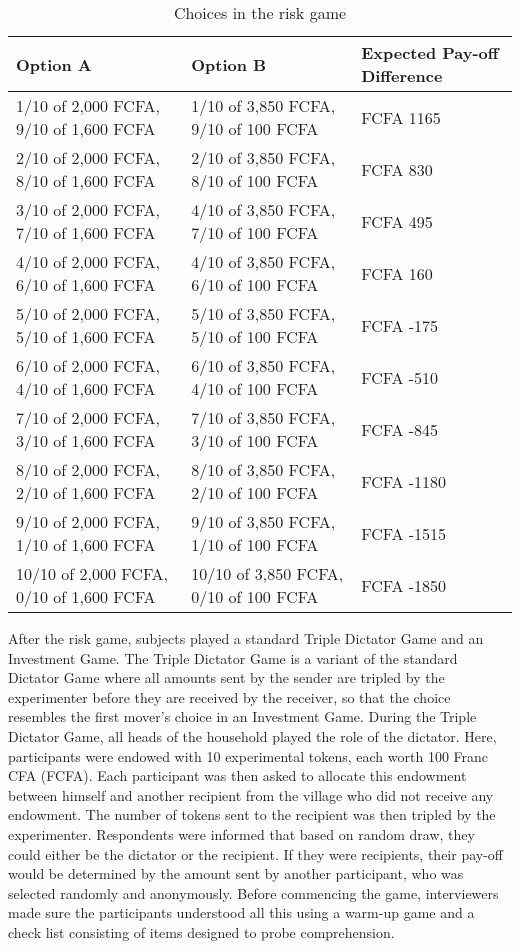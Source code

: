 \begin{table}[htb]
	\centering
	\caption{Choices in the risk game}
	\footnotesize
	\label{tab:risk_choices}
	\begin{tabular}{l l l}

	\toprule
	Option A & Option B & Expected Pay-off Difference \\
	\hline
	1/10 of 2,000 FCFA, 9/10 of 1,600 FCFA	& 1/10 of 3,850 FCFA, 9/10 of 100 FCFA 	& FCFA 1165 \\
	2/10 of 2,000 FCFA, 8/10 of 1,600 FCFA	& 2/10 of 3,850 FCFA, 8/10 of 100 FCFA 	& FCFA 830 \\
	3/10 of 2,000 FCFA, 7/10 of 1,600 FCFA	& 4/10 of 3,850 FCFA, 7/10 of 100 FCFA 	& FCFA 495 \\
	4/10 of 2,000 FCFA, 6/10 of 1,600 FCFA	& 4/10 of 3,850 FCFA, 6/10 of 100 FCFA 	& FCFA 160 \\
	5/10 of 2,000 FCFA, 5/10 of 1,600 FCFA	& 5/10 of 3,850 FCFA, 5/10 of 100 FCFA 	& FCFA -175 \\
	6/10 of 2,000 FCFA, 4/10 of 1,600 FCFA	& 6/10 of 3,850 FCFA, 4/10 of 100 FCFA 	& FCFA -510 \\
	7/10 of 2,000 FCFA, 3/10 of 1,600 FCFA	& 7/10 of 3,850 FCFA, 3/10 of 100 FCFA 	& FCFA -845 \\
	8/10 of 2,000 FCFA, 2/10 of 1,600 FCFA	& 8/10 of 3,850 FCFA, 2/10 of 100 FCFA 	& FCFA -1180 \\
	9/10 of 2,000 FCFA, 1/10 of 1,600 FCFA	& 9/10 of 3,850 FCFA, 1/10 of 100 FCFA 	& FCFA -1515 \\
	10/10 of 2,000 FCFA, 0/10 of 1,600 FCFA	& 10/10 of 3,850 FCFA, 0/10 of 100 FCFA & FCFA -1850 \\
	\bottomrule
	\end{tabular}
\end{table}


After the risk game, subjects played a standard Triple Dictator Game and an Investment Game. The Triple Dictator Game is a variant of the standard Dictator Game where all amounts sent by the sender are tripled by the experimenter before they are received by the receiver, so that the choice resembles the first mover's choice in an Investment Game. During the Triple Dictator Game, all heads of the household played the role of the dictator. Here, participants were endowed with 10 experimental tokens, each worth 100 Franc CFA (FCFA). Each participant was then asked to allocate this endowment between himself and another recipient from the village who did not receive any endowment. The number of tokens sent to the recipient was then tripled by the experimenter. Respondents were informed that based on random draw, they could either be the dictator or the recipient. If they were recipients, their pay-off would be determined by the amount sent by another participant, who was selected randomly and anonymously. Before commencing the game, interviewers made sure the participants understood all this using a warm-up game and a check list consisting of items designed to probe comprehension.

